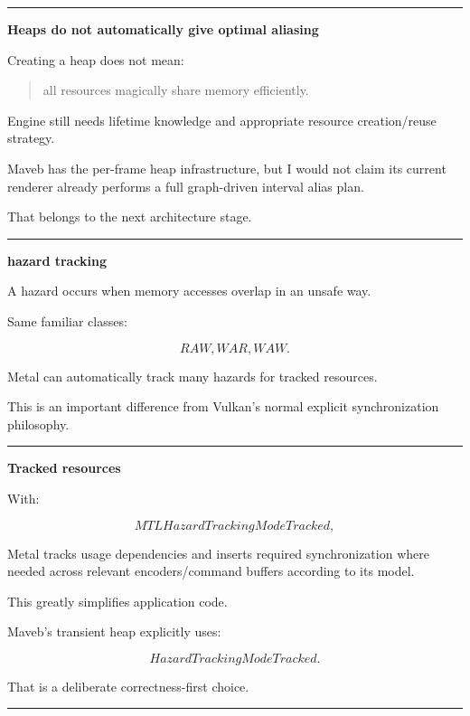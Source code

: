 \begin{center}\rule{0.5\linewidth}{0.5pt}\end{center}

\textbf{Heaps do not automatically give optimal aliasing}

Creating a heap does not mean:

\begin{quote}
all resources magically share memory efficiently.
\end{quote}

Engine still needs lifetime knowledge and appropriate resource creation/reuse strategy.

Maveb has the per-frame heap infrastructure, but I would not claim its current renderer already performs a full graph-driven interval alias plan.

That belongs to the next architecture stage.

\begin{center}\rule{0.5\linewidth}{0.5pt}\end{center}

\textbf{hazard tracking}

A hazard occurs when memory accesses overlap in an unsafe way.

Same familiar classes:

\[
RAW,
WAR,
WAW.
\]

Metal can automatically track many hazards for tracked resources.

This is an important difference from Vulkan's normal explicit synchronization philosophy.

\begin{center}\rule{0.5\linewidth}{0.5pt}\end{center}

\textbf{Tracked resources}

With:

\[
MTLHazardTrackingModeTracked,
\]

Metal tracks usage dependencies and inserts required synchronization where needed across relevant encoders/command buffers according to its model.

This greatly simplifies application code.

Maveb's transient heap explicitly uses:

\[
\boxed{HazardTrackingModeTracked}.
\]

That is a deliberate correctness-first choice.

\begin{center}\rule{0.5\linewidth}{0.5pt}\end{center}

